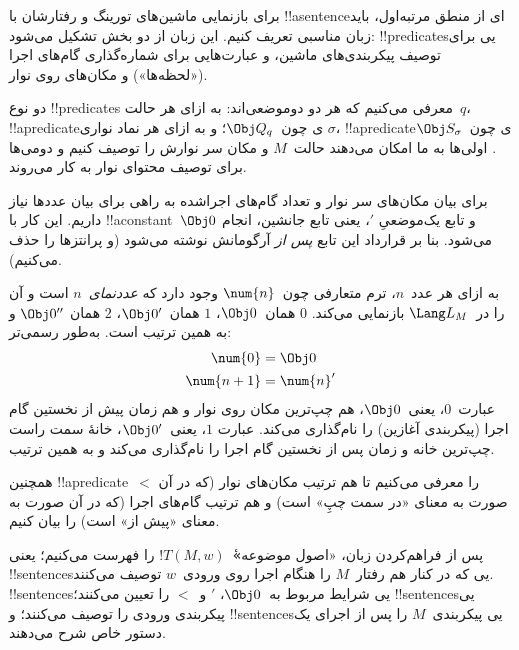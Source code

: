 \documentclass[../../../include/open-logic-section]{subfiles}
\begin{document}

\begin{explain}
برای بازنمایی ماشین‌های تورینگ و رفتارشان با !!a{sentence}ای از منطق
مرتبه‌اول، باید زبان مناسبی تعریف کنیم. این زبان از دو بخش تشکیل
می‌شود: !!{predicate}sیی برای توصیف پیکربندی‌های ماشین، و عبارت‌هایی
برای شماره‌گذاری گام‌های اجرا («لحظه‌ها») و مکان‌های روی نوار.

دو نوع !!{predicate}s معرفی می‌کنیم که هر دو دوموضعی‌اند: به ازای هر
حالت~$q$، !!a{predicate}ی چون~$\Obj Q_q$؛ و به ازای هر نماد نواری
$\sigma$، !!a{predicate}ی چون~$\Obj S_\sigma$. اولی‌ها به ما امکان می‌دهند
حالت~$M$ و مکان سر نوارش را توصیف کنیم و دومی‌ها برای توصیف محتوای
نوار به کار می‌روند.

برای بیان مکان‌های سر نوار و تعداد گام‌های اجراشده به راهی برای بیان
عددها نیاز داریم. این کار با !!a{constant}~$\Obj 0$ و تابع یک‌موضعیِ
$\prime$، یعنی تابع جانشین، انجام می‌شود. بنا بر قرارداد این تابع
\emph{پس از} آرگومانش نوشته می‌شود (و پرانتزها را حذف می‌کنیم).

به ازای هر عدد~$n$، ترم متعارفی چون~$\num{n}$ وجود دارد که
\emph{عددنمای}~$n$ است و آن را در~$\Lang L_M$ بازنمایی می‌کند.
$\num{0}$ همان~$\Obj 0$، $\num{1}$ همان~$\Obj 0'$، $\num{2}$ همان
$\Obj 0''$ و به همین ترتیب است. به‌طور رسمی‌تر:
\begin{align*}
\num{0} & = \Obj 0 \\
\num{n+1} &= \num{n}'
\end{align*}
عبارت~$\num{0}$، یعنی~$\Obj 0$، هم چپ‌ترین مکان روی نوار و هم زمان
پیش از نخستین گام اجرا (پیکربندی آغازین) را نام‌گذاری می‌کند. عبارت
$\num{1}$، یعنی~$\Obj 0'$، خانهٔ سمت راست چپ‌ترین خانه و زمان پس از
نخستین گام اجرا را نام‌گذاری می‌کند و به همین ترتیب.

همچنین !!a{predicate}~$<$ را معرفی می‌کنیم تا هم ترتیب مکان‌های نوار (که
در آن صورت به معنای «در سمت چپِ» است) و هم ترتیب گام‌های اجرا (که در
آن صورت به معنای «پیش از» است) را بیان کنیم.

پس از فراهم‌کردن زبان، «اصول موضوعه»ٔ~$!T(M,w)$ را فهرست می‌کنیم؛
یعنی !!{sentence}sیی که در کنار هم رفتار~$M$ را هنگام اجرا روی ورودی~$w$
توصیف می‌کنند. !!{sentence}sیی شرایط مربوط به~$\Obj 0$، $\prime$ و~$<$ را
تعیین می‌کنند؛ !!{sentence}sیی پیکربندی ورودی را توصیف می‌کنند؛ و !!{sentence}sیی
پیکربندی~$M$ را پس از اجرای یک دستور خاص شرح می‌دهند.
\end{explain}
\end{document}
